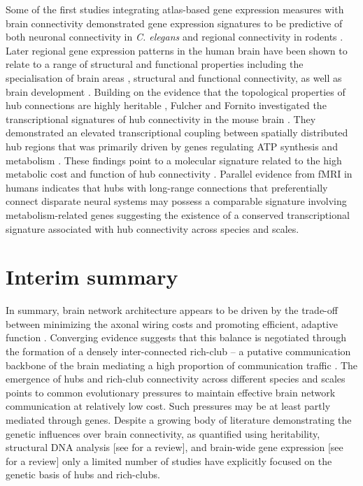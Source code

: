 Some of the first studies integrating atlas-based gene expression measures with brain connectivity demonstrated gene expression signatures to be predictive of both neuronal connectivity in \textit{C. elegans}
\citep{Kaufman2006} and regional connectivity in rodents \citep{Fakhry2015,Fakhry2015a,Ji2014}. Later regional gene expression patterns in the human brain have been shown to relate to a range of structural and functional properties including the specialisation of brain areas \citep{Anderson2018,Krienen2016,Parkes2017}, structural
\citep{Goel2014} and functional \citep{Cioli2014b,Forest2017,Richiardi2015,Vertes2016b} connectivity, as well as brain development \citep{Kirsch2016a,Whitaker2016a}. Building on the evidence that the topological properties of hub connections are highly heritable \citep{Fornito2011}, Fulcher and Fornito investigated the transcriptional signatures of hub connectivity in the mouse brain \citep{Fulcher2016}. They demonstrated an elevated transcriptional coupling between spatially distributed hub regions that was primarily driven by genes regulating ATP synthesis and metabolism \citep{Fulcher2016}. These findings point to a molecular signature related to the high metabolic cost and function of hub connectivity  \citep{Liang2013a,Tomasi2013}. Parallel evidence from fMRI in humans indicates that hubs with long-range connections that preferentially connect disparate neural systems may possess a comparable signature involving metabolism-related genes \citep{Vertes2016b} suggesting the existence of a conserved transcriptional signature associated with hub connectivity across species and scales.

\section{Interim summary}

In summary, brain network architecture appears to be driven by the trade-off between minimizing the axonal wiring costs and promoting efficient, adaptive function \citep{Bullmore2012}. Converging evidence suggests that this balance is negotiated through the formation of a densely inter-connected rich-club -- a putative communication backbone of the brain mediating a high proportion of communication traffic \citep{VandenHeuvel2011}. The emergence of hubs and rich-club connectivity across different species and scales points to common evolutionary pressures to maintain effective brain network communication at relatively low cost. Such pressures may be at least partly mediated through genes. Despite a growing body of literature demonstrating the genetic influences over brain connectivity, as quantified using heritability, structural DNA analysis [see \citet{Thompson2013} for a review], and brain-wide gene expression [see \citet{Fornito2019} for a review] only a limited number of studies have explicitly focused on the genetic basis of hubs and rich-clubs.

